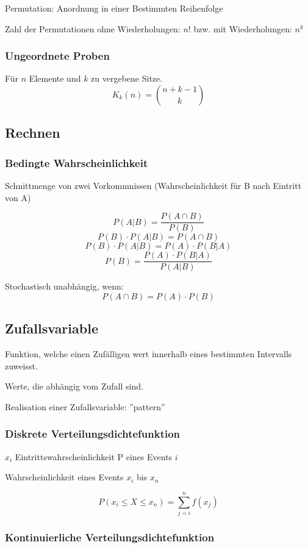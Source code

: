 Permutation: Anordnung in einer Bestimmten Reihenfolge

Zahl der Permutationen ohne Wiederholungen: $n!$ bzw. mit Wiederholungen: $n^k$

\subsubsection{Ungeordnete Proben}

Für $n$ Elemente und $k$ zu vergebene Sitze.
\[
	K_k(n) = \binom{n + k -1}{k}
\]

\subsection{Rechnen}

\subsubsection{Bedingte Wahrscheinlichkeit}

Schnittmenge von zwei Vorkommnissen (Wahrscheinlichkeit für B nach Eintritt von A)

\[
	P(A|B) = \frac{P(A \cap B)}{P(B)}
\]
\[
	P(B) \cdot P(A|B) = P(A \cap B)
\]
\[
	P(B) \cdot P(A|B) = P(A) \cdot P(B|A)
\]
\[
	P(B) = \frac{P(A) \cdot P(B | A)}{P(A|B)}
\]

Stochastisch unabhängig, wenn:
\[
	P(A \cap B) = P(A) \cdot P(B)
\]


\subsection{Zufallsvariable}

Funktion, welche einen Zufälligen wert innerhalb eines bestimmten Intervalls zuweisst.

Werte, die abhängig vom Zufall sind.

Realisation einer Zufallsvariable: ''pattern''

\subsubsection{Diskrete Verteilungsdichtefunktion}

$x_i$ Eintrittswahrscheinlichkeit P eines Events $i$

Wahrscheinlichkeit eines Events $x_i$ bis $x_n$

\[
P(x_i \leq X \leq x_n) = \sum^n_{j=i}{f(x_j)}
\]

\subsubsection{Kontinuierliche Verteilungsdichtefunktion}

